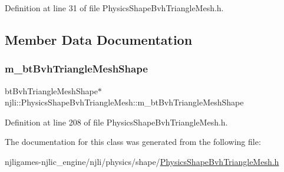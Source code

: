 Definition at line 31 of file Physics\+Shape\+Bvh\+Triangle\+Mesh.\+h.



\subsection{Member Data Documentation}
\mbox{\label{classnjli_1_1_physics_shape_bvh_triangle_mesh_a3e9723a04a224603d3349a898bf6746b}} 
\subsubsection{\texorpdfstring{m\+\_\+bt\+Bvh\+Triangle\+Mesh\+Shape}{m\_btBvhTriangleMeshShape}}
{\footnotesize\ttfamily bt\+Bvh\+Triangle\+Mesh\+Shape$\ast$ njli\+::\+Physics\+Shape\+Bvh\+Triangle\+Mesh\+::m\+\_\+bt\+Bvh\+Triangle\+Mesh\+Shape\hspace{0.3cm}{\ttfamily [private]}}



Definition at line 208 of file Physics\+Shape\+Bvh\+Triangle\+Mesh.\+h.



The documentation for this class was generated from the following file\+:\begin{DoxyCompactItemize}
\item 
njligames-\/njlic\+\_\+engine/njli/physics/shape/\mbox{\hyperlink{_physics_shape_bvh_triangle_mesh_8h}{Physics\+Shape\+Bvh\+Triangle\+Mesh.\+h}}\end{DoxyCompactItemize}
